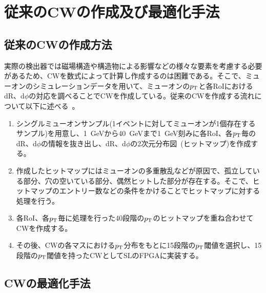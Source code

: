 \section{従来のCWの作成及び最適化手法}\label{section:最適化}
\subsection{従来のCWの作成方法}
実際の検出器では磁場構造や構造物による影響などの様々な要素を考慮する必要があるため、CWを数式によって計算し作成するのは困難である。そこで、ミューオンのシミュレーションデータを用いて、ミューオンの$p_{\rm{T}}$と各RoIにおけるdR、d$\phi$の対応を調べることでCWを作成している。従来のCWを作成する流れについて以下に述べる~\cite{article:shiomi-mron}。
\begin{enumerate}\label{table:makeCW}
   \item シングルミューオンサンプル(1イベントに対してミューオンが1個存在するサンプル)を用意し、1~GeVから40~GeVまで1~GeV刻みに各RoI、各$p_{\rm{T}}$毎のdR、d$\phi$の情報を抜き出し、dR、d$\phi$の2次元分布図~(ヒットマップ)を作成する。
   \item 作成したヒットマップにはミューオンの多重散乱などが原因で、孤立している部分、穴の空いている部分、偶然ヒットした部分が存在する。そこで、ヒットマップのエントリー数などの条件をかけることでヒットマップに対する処理を行う。
   \item 各RoI、各$p_{\rm{T}}$毎に処理を行った40段階の$p_{\rm{T}}$のヒットマップを重ね合わせてCWを作成する。
   \item その後、CWの各マスにおける$p_{\rm{T}}$分布をもとに15段階の$p_{\rm{T}}$閾値を選択し、15段階の$p_{\rm{T}}$閾値を持ったCWとしてSLのFPGAに実装する。
\end{enumerate}



\subsection{CWの最適化手法}
